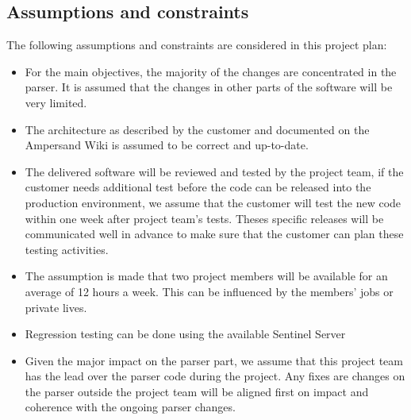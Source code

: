 \subsection{Assumptions and constraints}
\label{sec:assumptions-constraints}
The following assumptions and constraints are considered in this project plan:
\begin{itemize}
	\item For the main objectives, the majority of the changes are concentrated in the parser.
		It is assumed that the changes in other parts of the software will be very limited.
	\item The architecture as described by the customer and documented on the Ampersand Wiki is assumed to be correct and up-to-date.
	\item The delivered software will be reviewed and tested by the project team, if the customer needs additional test before the code can be released into the production environment, we assume that the customer will test the new code within one week after project team's tests. Theses specific releases will be communicated well in advance to make sure that the customer can plan these testing activities.
	\item The assumption is made that two project members will be available for an average of 12 hours a week.
		This can be influenced by the members' jobs or private lives.
	\item Regression testing can be done using the available Sentinel Server
	\item Given the major impact on the parser part, we assume that this project team has the lead over the parser code during the project.
		Any fixes are changes on the parser outside the project team will be aligned first on impact and coherence with the ongoing parser changes.
\end{itemize}

